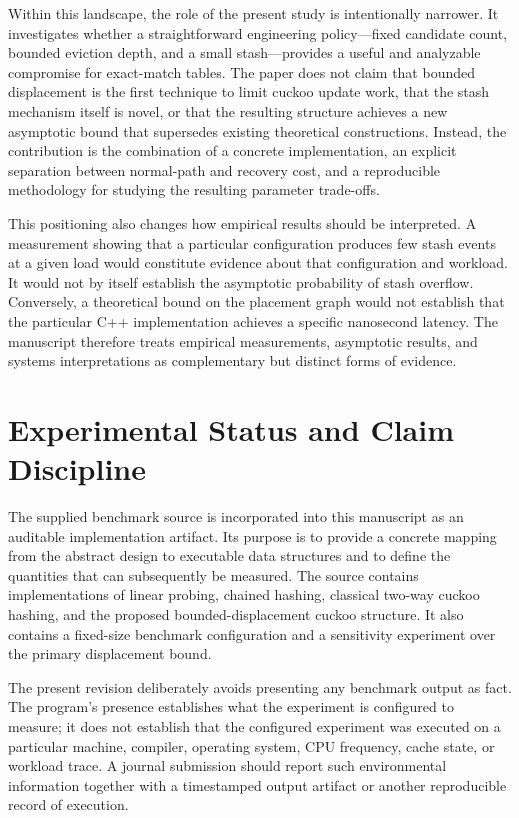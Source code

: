 \documentclass[conference]{IEEEtran}
\begin{document}
Within this landscape, the role of the present study is intentionally narrower. It investigates whether a straightforward engineering policy—fixed candidate count, bounded eviction depth, and a small stash—provides a useful and analyzable compromise for exact-match tables. The paper does not claim that bounded displacement is the first technique to limit cuckoo update work, that the stash mechanism itself is novel, or that the resulting structure achieves a new asymptotic bound that supersedes existing theoretical constructions. Instead, the contribution is the combination of a concrete implementation, an explicit separation between normal-path and recovery cost, and a reproducible methodology for studying the resulting parameter trade-offs.

This positioning also changes how empirical results should be interpreted. A measurement showing that a particular configuration produces few stash events at a given load would constitute evidence about that configuration and workload. It would not by itself establish the asymptotic probability of stash overflow. Conversely, a theoretical bound on the placement graph would not establish that the particular C++ implementation achieves a specific nanosecond latency. The manuscript therefore treats empirical measurements, asymptotic results, and systems interpretations as complementary but distinct forms of evidence.

\section{Experimental Status and Claim Discipline}

The supplied benchmark source is incorporated into this manuscript as an auditable implementation artifact. Its purpose is to provide a concrete mapping from the abstract design to executable data structures and to define the quantities that can subsequently be measured. The source contains implementations of linear probing, chained hashing, classical two-way cuckoo hashing, and the proposed bounded-displacement cuckoo structure. It also contains a fixed-size benchmark configuration and a sensitivity experiment over the primary displacement bound.

The present revision deliberately avoids presenting any benchmark output as fact. The program's presence establishes what the experiment is configured to measure; it does not establish that the configured experiment was executed on a particular machine, compiler, operating system, CPU frequency, cache state, or workload trace. A journal submission should report such environmental information together with a timestamped output artifact or another reproducible record of execution.
\end{document}
